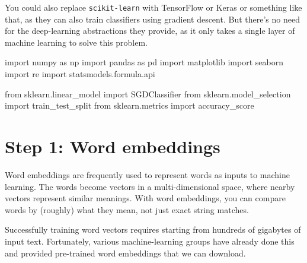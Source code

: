 \documentclass[]{book}
\newenvironment{Shaded}{\begin{snugshade}}{\end{snugshade}}
\newcommand{\DecValTok}[1]{\textcolor[rgb]{0.00,0.00,0.81}{#1}}
\newcommand{\FloatTok}[1]{\textcolor[rgb]{0.00,0.00,0.81}{#1}}
\newcommand{\StringTok}[1]{\textcolor[rgb]{0.31,0.60,0.02}{#1}}
\newcommand{\ImportTok}[1]{#1}
\newcommand{\CommentTok}[1]{\textcolor[rgb]{0.56,0.35,0.01}{\textit{#1}}}
\newcommand{\OperatorTok}[1]{\textcolor[rgb]{0.81,0.36,0.00}{\textbf{#1}}}
\newcommand{\NormalTok}[1]{#1}
\theoremstyle{definition}
\theoremstyle{definition}
\theoremstyle{definition}
\theoremstyle{remark}
\begin{document}
You could also replace \texttt{scikit-learn} with TensorFlow or Keras or
something like that, as they can also train classifiers using gradient
descent. But there's no need for the deep-learning abstractions they
provide, as it only takes a single layer of machine learning to solve
this problem.

\begin{Shaded}
\begin{Highlighting}[]
\ImportTok{import}\NormalTok{ numpy }\ImportTok{as}\NormalTok{ np}
\ImportTok{import}\NormalTok{ pandas }\ImportTok{as}\NormalTok{ pd}
\ImportTok{import}\NormalTok{ matplotlib}
\ImportTok{import}\NormalTok{ seaborn}
\ImportTok{import}\NormalTok{ re}
\ImportTok{import}\NormalTok{ statsmodels.formula.api}

\ImportTok{from}\NormalTok{ sklearn.linear_model }\ImportTok{import}\NormalTok{ SGDClassifier}
\ImportTok{from}\NormalTok{ sklearn.model_selection }\ImportTok{import}\NormalTok{ train_test_split}
\ImportTok{from}\NormalTok{ sklearn.metrics }\ImportTok{import}\NormalTok{ accuracy_score}
\end{Highlighting}
\end{Shaded}

\begin{Shaded}
\end{Shaded}

\section{Step 1: Word embeddings}\label{step-1-word-embeddings}

Word embeddings are frequently used to represent words as inputs to
machine learning. The words become vectors in a multi-dimensional space,
where nearby vectors represent similar meanings. With word embeddings,
you can compare words by (roughly) what they mean, not just exact string
matches.

Successfully training word vectors requires starting from hundreds of
gigabytes of input text. Fortunately, various machine-learning groups
have already done this and provided pre-trained word embeddings that we
can download.
\end{document}
